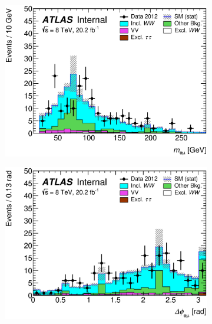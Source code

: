 \begin{figure}[!h]
\begin{subfigure}{0.5\textwidth}
   \includegraphics[width=\textwidth]{figures/emme-xtraTracks-Mll-lin.eps}
\end{subfigure}
\begin{subfigure}{0.5\textwidth}
   \includegraphics[width=\textwidth]{figures/emme-xtraTracks-DPhill-lin.eps}
\end{subfigure} 
\begin{subfigure}{0.5\textwidth}

\end{subfigure}
\end{figure}
